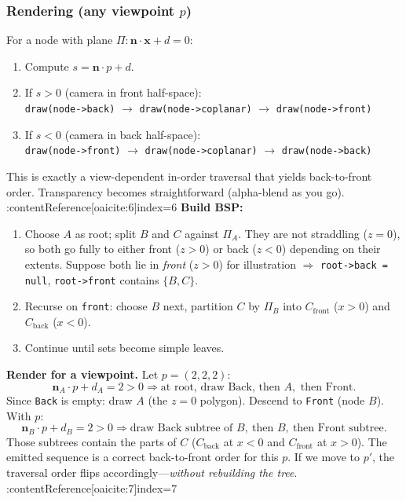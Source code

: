 \documentclass[10pt,twocolumn]{extarticle}
\begin{document}
\subsubsection*{Rendering (any viewpoint $p$)}
For a node with plane $\Pi:\mathbf{n}\cdot\mathbf{x}+d=0$:
\begin{enumerate}
  \item Compute $s=\mathbf{n}\cdot p + d$.
  \item If $s>0$ (camera in front half-space): \\
        \hspace*{1em} \texttt{draw(node->back)} $\rightarrow$ \texttt{draw(node->coplanar)} $\rightarrow$ \texttt{draw(node->front)}
  \item If $s<0$ (camera in back half-space): \\
        \hspace*{1em} \texttt{draw(node->front)} $\rightarrow$ \texttt{draw(node->coplanar)} $\rightarrow$ \texttt{draw(node->back)}
\end{enumerate}
This is exactly a view-dependent in-order traversal that yields back-to-front order. Transparency becomes straightforward (alpha-blend as you go). :contentReference[oaicite:6]{index=6}
\textbf{Build BSP:}
\begin{enumerate}
  \item Choose $A$ as root; split $B$ and $C$ against $\Pi_A$. They are not straddling ($z=0$), so both go fully to either front ($z>0$) or back ($z<0$) depending on their extents. Suppose both lie in \emph{front} ($z>0$) for illustration $\Rightarrow$ \texttt{root->back = null}, \texttt{root->front} contains $\{B,C\}$.
  \item Recurse on \texttt{front}: choose $B$ next, partition $C$ by $\Pi_B$ into $C_\text{front}$ ($x>0$) and $C_\text{back}$ ($x<0$).
  \item Continue until sets become simple leaves.
\end{enumerate}

\textbf{Render for a viewpoint.}
Let $p=(2,2,2)$:
\[
\mathbf{n}_A\cdot p + d_A = 2>0 \Rightarrow \text{at root, draw Back, then }A,\text{ then Front}.
\]
Since \texttt{Back} is empty: draw $A$ (the $z=0$ polygon). Descend to \texttt{Front} (node $B$). With $p$:
\[
\mathbf{n}_B\cdot p + d_B = 2>0 \Rightarrow \text{draw Back subtree of }B,\ \text{then }B,\ \text{then Front subtree}.
\]
Those subtrees contain the parts of $C$ ($C_\text{back}$ at $x<0$ and $C_\text{front}$ at $x>0$). The emitted sequence is a correct back-to-front order for this $p$. If we move to $p'$, the traversal order flips accordingly—\emph{without rebuilding the tree}. :contentReference[oaicite:7]{index=7}
\end{document}

